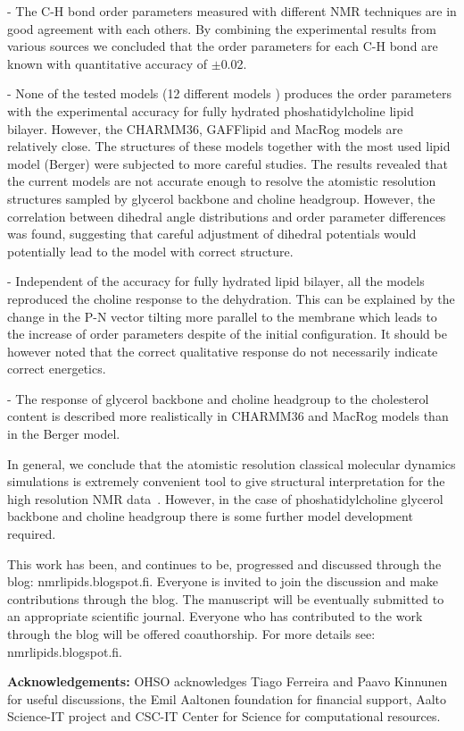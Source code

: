 \documentclass[pre,aps,floatfix,authordate1-4,twocolumn]{revtex4-1}
\begin{document}
- The C-H bond order parameters measured with different NMR techniques are in good agreement
with each others. By combining the experimental results from various sources we concluded
that the order parameters for each C-H bond are known with quantitative accuracy of $\pm$0.02.

- None of the tested models (12 different models  ) produces the order parameters with the experimental
accuracy for fully hydrated phoshatidylcholine lipid bilayer. However, the CHARMM36, GAFFlipid and MacRog 
models are relatively close. The structures of these models together with the most used lipid model (Berger) 
were subjected to more careful studies. The results revealed that the current models are not accurate
enough to resolve the atomistic resolution structures sampled by glycerol backbone and choline headgroup.  
However, the correlation between dihedral angle distributions and order parameter differences was found, 
suggesting that careful adjustment of dihedral potentials would potentially lead to the model with correct
structure.

- Independent of the accuracy for fully hydrated lipid bilayer, all the models reproduced the choline response
to the dehydration. This can be explained by the change in the P-N vector tilting more parallel to the membrane
which leads to the increase of order parameters despite of the initial configuration. It should be however noted
that the correct qualitative response do not necessarily indicate correct energetics. 

- The response of glycerol backbone and choline headgroup to the cholesterol content is described more
realistically in CHARMM36 and MacRog models than in the Berger model.

In general, we conclude that the atomistic resolution classical molecular dynamics simulations 
is extremely convenient tool to give structural interpretation for the high resolution NMR data~\cite{ferreira14}. 
However, in the case of phoshatidylcholine glycerol backbone and choline headgroup there is some
further model development required.

This work has been, and continues to be, progressed and discussed through the blog: nmrlipids.blogspot.fi. 
Everyone is invited to join the discussion and make contributions through the blog. 
The manuscript will be eventually submitted to an appropriate scientific journal. 
Everyone who has contributed to the work through the blog will be offered 
coauthorship. For more details see: nmrlipids.blogspot.fi. 



{\bf Acknowledgements: }
OHSO acknowledges Tiago Ferreira and Paavo Kinnunen for useful discussions, the Emil Aaltonen foundation for financial support, Aalto Science-IT project and CSC-IT Center for Science for computational resources. 




\newpage

\onecolumngrid

 \listoftodos
\end{document}
